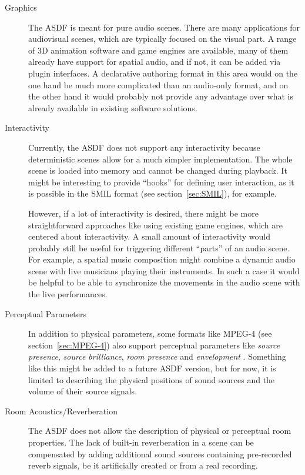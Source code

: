 \begin{description}

\item[Graphics]
The ASDF is meant for pure audio scenes.
There are many applications for audiovisual scenes,
which are typically focused on the visual part.
A range of 3D animation software
and game engines are available,
many of them already have support for spatial audio,
and if not, it can be added via plugin interfaces.
A declarative authoring format in this area would on the one hand
be much more complicated than an audio-only format,
and on the other hand it would probably not provide any advantage over
what is already available in existing software solutions.

\item[Interactivity]
Currently, the ASDF does not support any interactivity
because deterministic scenes allow for a much simpler implementation.
The whole scene is loaded into memory and cannot be changed during playback.
It might be interesting to provide ``hooks'' for defining user interaction,
as it is possible in the SMIL format (see section~\ref{sec:SMIL}), for example.

However, if a lot of interactivity is desired,
there might be more straightforward approaches
like using existing game engines, which are centered about interactivity.
A small amount of interactivity would probably still be useful
for triggering different ``parts'' of an audio scene.
For example, a spatial music composition might combine a dynamic audio scene
with live musicians playing their instruments.
In such a case it would be helpful to be able to synchronize the movements in
the audio scene with the live performances.

\item[Perceptual Parameters]
In addition to physical parameters,
some formats like MPEG-4 (see section~\ref{sec:MPEG-4})
also support perceptual parameters like
\emph{source presence}, \emph{source brilliance}, \emph{room presence}
and \emph{envelopment} \parencite{vaananen2003parametrization}.
Something like this might be added to a future ASDF version,
but for now, it is limited to describing the physical positions of sound sources
and the volume of their source signals.

\item[Room Acoustics/Reverberation]
The ASDF does not allow the description of
physical or perceptual room properties.
The lack of built-in reverberation in a scene
can be compensated
by adding additional sound sources
containing pre-recorded reverb signals,
be it artificially created or from a real recording.


\end{description}
